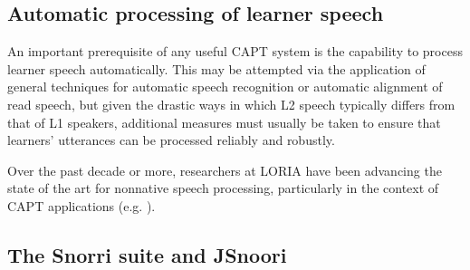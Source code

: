 	\subsection{Automatic processing of learner speech}
	\label{sec:capt:auto}
	
	
	An important prerequisite of any useful CAPT system is the capability to process learner speech automatically. This may be attempted via the application of general techniques for automatic speech recognition or automatic alignment of read speech, but given the drastic ways in which L2 speech typically differs from that of L1 speakers, additional measures must usually be taken to ensure that learners' utterances can be processed reliably and robustly.
	
	Over the past decade or more, researchers at LORIA have been advancing the state of the art for nonnative speech processing, particularly in the context of CAPT applications (e.g. \cite{Bouselmi2005,Bouselmi2012,Mesbahi2011,Orosanu2012,Jouvet2011,Bonneau2012}).
		
	
	
	
	\subsection{The Snorri suite and JSnoori}
	\label{sec:capt:snoori}
	
